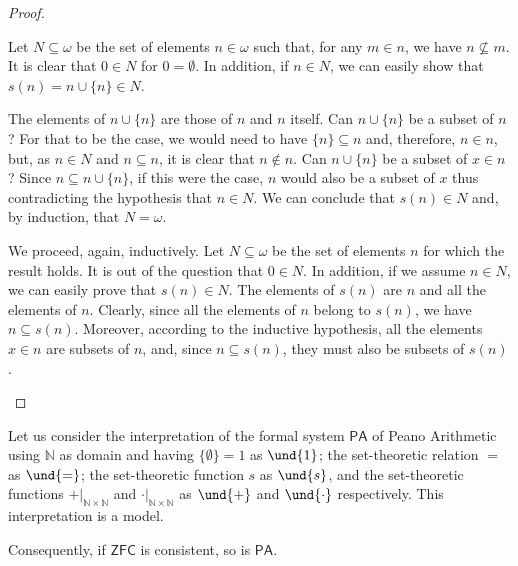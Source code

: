 \begin{proof}
\begin{parlist}
\item Let $N\subseteq \omega$ be the set of elements $n\in\omega$ such that, for any $m\in n$, we have $n\not\subseteq m$. It is clear that $0 \in N$ for $0 = \emptyset$. In addition, if $n \in N$, we can easily show that $s(n) = n \cup \{n\}\in N$.

The elements of $n \cup \{n\}$ are those of $n$ and $n$ itself. Can $n\cup\{n\}$ be a subset of $n$? For that to be the case, we would need to have $\{n\}\subseteq n$ and, therefore, $n\in n$, but, as $n\in N$ and $n\subseteq n$, it is clear that $n\not\in n$. Can $n\cup \{n\}$ be a subset of $x\in n$? Since $n\subseteq n \cup\{n\}$, if this were the case, $n$ would also be a subset of $x$ thus contradicting the hypothesis that $n\in N$. We can conclude that $s(n) \in N$ and, by induction, that $N = \omega$.

\item We proceed, again, inductively. Let $N\subseteq\omega$ be the set of elements $n$ for which the result holds.
It is out of the question that $0\in N$.
In addition, if we assume $n\in N$, we can easily prove that $s(n)\in N$.
The elements of $s(n)$ are $n$ and all the elements of $n$.
Clearly, since all the elements of $n$ belong to $s(n)$, we have $n\subseteq s(n)$.
Moreover, according to the inductive hypothesis, all the elements $x\in n$ are subsets of $n$, and, since $n \subseteq s(n)$, they must also be subsets of $s(n)$.
\end{parlist}
\end{proof}


\begin{theorem}
Let us consider the interpretation of the formal system $\mathsf{PA}$ of Peano Arithmetic using $\mathbb{N}$ as domain and having $\{\emptyset\} = 1$ as $\und{1}$; the set-theoretic relation $=$ as $\und{=}$; the set-theoretic function $s$ as $\und{s}$, and the set-theoretic functions $+\vert_{\mathbb{N}\times\mathbb{N}}$ and $\cdot\vert_{\mathbb{N}\times\mathbb{N}}$ as $\und{+}$ and $\und{\cdot}$ respectively.
This interpretation is a model.

Consequently, if $\mathsf{ZFC}$ is consistent, so is $\mathsf{PA}$.
\label{<+label+>}
\end{theorem}

